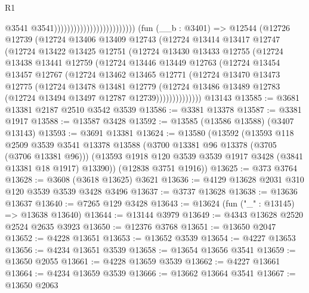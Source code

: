 \begin{lexlean}{R1}
\begin{coremodule}
                                                      @3541
                                                      @3541)))))))))))))))))))))))))
    (fun (__b : @3401) =>
    @12544
      (@12726
        @12739
        (@12724
          @13406
          @13409
          @12743
          (@12724
            @13414
            @13417
            @12747
            (@12724
              @13422
              @13425
              @12751
              (@12724
                @13430
                @13433
                @12755
                (@12724
                  @13438
                  @13441
                  @12759
                  (@12724
                    @13446
                    @13449
                    @12763
                    (@12724
                      @13454
                      @13457
                      @12767
                      (@12724
                        @13462
                        @13465
                        @12771
                        (@12724
                          @13470
                          @13473
                          @12775
                          (@12724
                            @13478
                            @13481
                            @12779
                            (@12724
                              @13486
                              @13489
                              @12783
                              (@12724 @13494 @13497 @12787 @12739))))))))))))))
    @13143
@13585 := @3681 @13381 @2187 @2510 @3542 @3539
@13586 := @3381 @13378
@13587 := @3381 @1917
@13588 := @13587 @3428
@13592 := @13585 (@13586 @13588) (@3407 @13143)
@13593 := @3691 @13381
@13624 := @13580
    (@13592
      (@13593
        @118
        @2509
        @3539
        @3541
        @13378
        @13588
        (@3700 @13381 @96 @13378 (@3705 (@3706 @13381 @96)))
        (@13593 @1918 @120 @3539 @3539 @1917 @3428 (@3841 @13381 @18 @1917) @13390))
      (@12838 @3751 @1916))
@13625 := @373 @3764
@13628 := @3608 (@3618 @13625) @3621
@13636 := @4129 @13628 @2031 @310 @120 @3539 @3539 @3428 @3496
@13637 := @3737 @13628
@13638 := @13636 @13637
@13640 := @7265 @129 @3428
@13643 := @13624 (fun ("_" : @13145) => @13638 @13640)
@13644 := @13144 @3979
@13649 := @4343 @13628 @2520 @2524 @2635 @3923
@13650 := @12376 @3768
@13651 := @13650 @2047
@13652 := @4228 @13651
@13653 := @13652 @3539
@13654 := @4227 @13653
@13656 := @4234 @13651 @3539
@13658 := @13654 @13656 @3541
@13659 := @13650 @2055
@13661 := @4228 @13659 @3539
@13662 := @4227 @13661
@13664 := @4234 @13659 @3539
@13666 := @13662 @13664 @3541
@13667 := @13650 @2063

\end{coremodule}
\end{lexlean}
